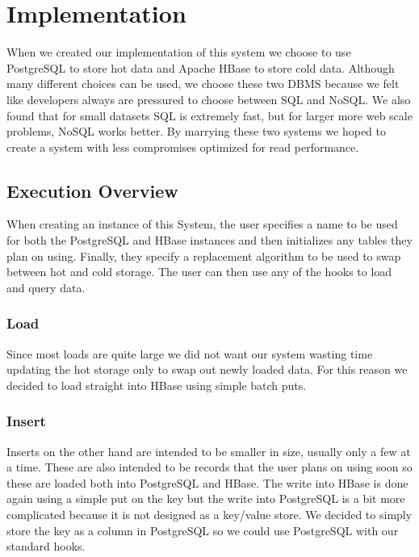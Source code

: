 \documentclass[12pt]{article}
\begin{document}
\section{Implementation}
When we created our implementation of this system we choose to use PostgreSQL to store hot data and Apache HBase to store cold data. Although many different choices can be used, we choose these two DBMS because we felt like developers always are pressured to choose between SQL and NoSQL. We also found that for small datasets SQL is extremely fast, but for larger more web scale problems, NoSQL works better. By marrying these two systems we hoped to create a system with less compromises optimized for read performance.

\subsection{Execution Overview}
When creating an instance of this System, the user specifies a name to be used for both the PostgreSQL and HBase instances and then initializes any tables they plan on using. Finally, they specify a replacement algorithm to be used to swap between hot and cold storage. The user can then use any of the hooks to load and query data. 

\subsubsection{Load}
Since most loads are quite large we did not want our system wasting time updating the hot storage only to swap out newly loaded data. For this reason we decided to load straight into HBase using simple batch puts.

\subsubsection{Insert}
Inserts on the other hand are intended to be smaller in size, usually only a few at a time. These are also intended to be records that the user plans on using soon so these are loaded both into PostgreSQL and HBase. The write into HBase is done again using a simple put on the key but the write into PostgreSQL is a bit more complicated because it is not designed as a key/value store. We decided to simply store the key as a column in PostgreSQL so we could use PostgreSQL with our standard hooks. 
\end{document}
